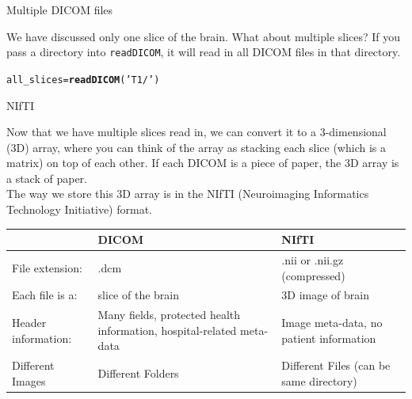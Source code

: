 \documentclass[11pt]{beamer}\usepackage[]{graphicx}\usepackage[]{color}
\makeatletter
\newcommand{\hlstr}[1]{\textcolor[rgb]{0.192,0.494,0.8}{#1}}%
\newcommand{\hlstd}[1]{\textcolor[rgb]{0.345,0.345,0.345}{#1}}%
\newcommand{\hlkwb}[1]{\textcolor[rgb]{0.69,0.353,0.396}{#1}}%
\newcommand{\hlkwd}[1]{\textcolor[rgb]{0.737,0.353,0.396}{\textbf{#1}}}%
\newenvironment{kframe}{%
 \def\at@end@of@kframe{}%
 \ifinner\ifhmode%
  \def\at@end@of@kframe{\end{minipage}}%
  \begin{minipage}{\columnwidth}%
 \fi\fi%
 \def\FrameCommand##1{\hskip\@totalleftmargin \hskip-\fboxsep
 \colorbox{shadecolor}{##1}\hskip-\fboxsep
     \hskip-\linewidth \hskip-\@totalleftmargin \hskip\columnwidth}%
 \MakeFramed {\advance\hsize-\width
   \@totalleftmargin\z@ \linewidth\hsize
   \@setminipage}}%
 {\par\unskip\endMakeFramed%
 \at@end@of@kframe}
\newenvironment{knitrout}{}{} %
\makeatother
\begin{document}
\begin{frame}[fragile]{Multiple DICOM files}

We have discussed only one slice of the brain.  What about multiple slices?  If you pass a directory into \verb|readDICOM|, it will read in all DICOM files in that directory.

\begin{knitrout}
\color{fgcolor}\begin{kframe}
\begin{alltt}
\hlstd{all_slices} \hlkwb{=} \hlkwd{readDICOM}\hlstd{(}\hlstr{'T1/'}\hlstd{)}
\end{alltt}
\end{kframe}
\end{knitrout}


\end{frame}



\begin{frame}[fragile]{NIfTI}

Now that we have multiple slices read in, we can convert it to a 3-dimensional (3D) array, where you can think of the array as stacking each slice (which is a matrix) on top of each other.  If each DICOM is a piece of paper, the 3D array is a stack of paper.\\

The way we store this 3D array is in the NIfTI (Neuroimaging Informatics Technology Initiative) format.  \\

\begin{table}[h]
\begin{tabular}{m{}|m{}|m{}}
& DICOM & NIfTI \\ \hline
File extension: & .dcm & .nii or .nii.gz (compressed) \\
Each file is a: & slice of the brain & 3D image of brain \\
Header information: & Many fields, protected health information, hospital-related meta-data & Image meta-data, no patient information \\
Different Images & Different Folders & Different Files (can be same directory)
\end{tabular}
\end{table}
\end{frame}
\end{document}
